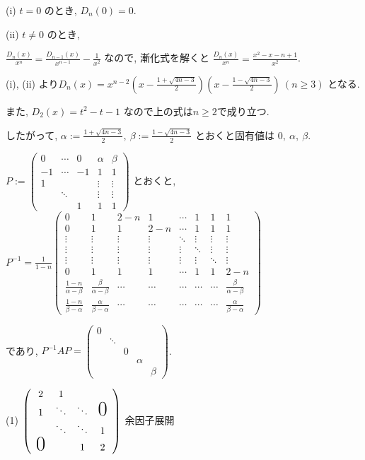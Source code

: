\documentclass{jsarticle}
\begin{document}
(i) $t = 0$ のとき, $D_n(0) = 0$.

(ii) $t \neq 0$ のとき, 

$\displaystyle \frac{D_n(x)}{x^n} = \displaystyle \frac{D_{n-1}(x)}{x^{n-1}} - \displaystyle \frac{1}{x^2}$ なので, 漸化式を解くと
$\displaystyle \frac{D_n(x)}{x^n} = \displaystyle \frac{x^2 - x - n + 1}{x^2}$. 

(i), (ii) より$D_n(x) = x^{n-2}\left(x - \displaystyle \frac{1 + \sqrt{4n-3}}{2}\right) \left(x - \displaystyle \frac{1 - \sqrt{4n-3}}{2} \right) \ (n \ge 3)$ となる.

また, $D_2(x) = t^2 - t -1$ なので上の式は$n \ge 2$で成り立つ.

したがって, $\alpha := \displaystyle \frac{1 + \sqrt{4n-3}}{2}, \ \beta := \displaystyle \frac{1 - \sqrt{4n-3}}{2}$ とおくと固有値は $0, \ \alpha, \ \beta$.

$P := \begin{pmatrix}
0 & \cdots & 0 & \alpha & \beta \\
-1 & \cdots & -1 & 1 & 1 \\
1 & & & \vdots & \vdots \\
 & \ddots & & \vdots & \vdots \\
 & & 1 & 1 & 1 \end{pmatrix}$
とおくと, 
$P^{-1} = \displaystyle \frac{1}{1-n} 
\begin{pmatrix} 0 & 1 & 2-n & 1 & \cdots & 1 & 1 & 1 \\
                0 & 1 & 1 & 2-n & \cdots & 1 & 1 & 1 \\
 \vdots & \vdots & \vdots & \vdots & \ddots & \vdots & \vdots & \vdots \\
 \vdots & \vdots & \vdots & \vdots & \vdots & \ddots & \vdots & \vdots \\
 \vdots & \vdots & \vdots & \vdots & \vdots & \vdots & \ddots & \vdots \\
               0 & 1 & 1 & 1 & \cdots & 1 & 1 & 2-n \\
\frac{1-n}{\alpha - \beta} & \frac{\beta}{\alpha - \beta} & \cdots & \cdots & \cdots & \cdots & \cdots & \frac{\beta}{\alpha - \beta} \\
\frac{1-n}{\beta - \alpha} & \frac{\alpha}{\beta - \alpha} & \cdots & \cdots & \cdots & \cdots & \cdots & \frac{\alpha}{\beta - \alpha}
\end{pmatrix}$

であり, $P^{-1}AP = \begin{pmatrix}
0 & & & & \\
 & \ddots & & & \\
 & & 0 & & \\
 & & & \alpha & \\
 & & & & \beta \end{pmatrix}$.

\bigskip
\bigskip
\bigskip
\bigskip

(1)
$
\left(\begin{array}{cccc}
2 & 1 & &  \\
1 & \ddots & \ddots &\text{\huge{0}} \\
  & \ddots & \ddots & 1\\
\text{\huge{0}} & & 1 & 2
\end{array}\right)
$
余因子展開
\end{document}
